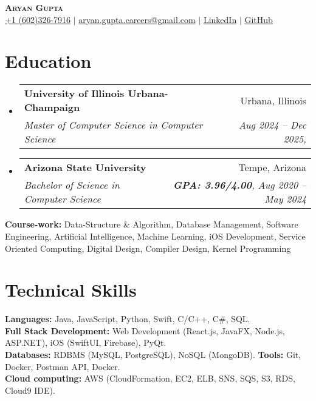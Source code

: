 \documentclass[letterpaper,11pt]{article}
\makeatletter
\newcommand{\resumeEducationHeading}[5]{
  \vspace{-2pt}\item
    \begin{tabular*}{0.97\textwidth}[t]{l@{\extracolsep{\fill}}r}
      \textbf{#1} & #2 \\
      \textit{\small#3} & \textit{\small #4, #5} \\
    \end{tabular*}\vspace{-5pt}
}
\newcommand{\resumeSubHeadingListStart}{\begin{itemize}[leftmargin=0.15in, label={}]}
\newcommand{\resumeSubHeadingListEnd}{\end{itemize}}
\makeatother
\begin{document}
\begin{center}
  \textbf{\Huge \scshape Aryan Gupta} \\ \vspace{3pt}
  \small
  \faMobile \hspace{.5pt} \href{tel:6023267916}{+1 (602)326-7916}
  $|$
  \faAt \hspace{.5pt} \href{mailto:aryan.gupta.careers@gmail.com}{aryan.gupta.careers@gmail.com}
  $|$
  \faLinkedinSquare \hspace{.5pt} \href{https://www.linkedin.com/in/agupt295}{LinkedIn}
  $|$
  \faGithub \hspace{.5pt} \href{https://github.com/agupt295}{GitHub}
\end{center}

\section{Education}
\resumeSubHeadingListStart
  \resumeEducationHeading
    {University of Illinois Urbana-Champaign}{Urbana, Illinois}
    {Master of Computer Science in Computer Science}{Aug 2024 -- Dec 2025}{}{}
\resumeSubHeadingListEnd
\vspace{-0.1cm} %
\resumeSubHeadingListStart
  \resumeEducationHeading
    {Arizona State University}{Tempe, Arizona}
    {Bachelor of Science in Computer Science}{\textbf{GPA: 3.96/4.00}}{Aug 2020 -- May 2024}{}
\resumeSubHeadingListEnd

  \resumeSubHeadingListStart
    \small{\item{
        \textbf{Course-work:}{ Data-Structure \& Algorithm, Database Management, Software Engineering, Artificial Intelligence, Machine Learning, iOS Development, Service Oriented Computing, Digital Design, Compiler Design, Kernel Programming} \\ \vspace{3pt}
    }}
  \resumeSubHeadingListEnd

\section{Technical Skills}
  \resumeSubHeadingListStart
    \small{\item{
      \textbf{Languages:}{ Java, JavaScript, Python, Swift, C/C++, C\#, SQL. } \\ \vspace{3pt}
      \textbf{Full Stack Development:}{ Web Development (React.js, JavaFX, Node.js, ASP.NET), iOS (SwiftUI, Firebase), PyQt. } \\ \vspace{3pt}
      \textbf{Databases:}{ RDBMS (MySQL, PostgreSQL), NoSQL (MongoDB). }\textbf{Tools:}{ Git, Docker, Postman API, Docker.} \\ \vspace{3pt}
      \textbf{Cloud computing:}{ AWS (CloudFormation, EC2, ELB, SNS, SQS, S3, RDS, Cloud9 IDE).}
    }}
  \resumeSubHeadingListEnd
\end{document}
